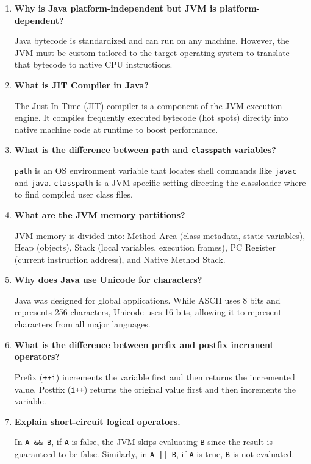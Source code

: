 \documentclass[12pt,a4paper]{article}
\newcommand{\Q}[1]{\textbf{#1}\par\noindent\ignorespaces}
\begin{document}
\begin{tcolorbox}[exambox, title={\textbf{Frequently Asked / Viva Questions}}]
\begin{enumerate}[leftmargin=*, label=\textbf{Q\arabic*.}, itemsep=5pt]
  \item \Q{Why is Java platform-independent but JVM is platform-dependent?}
        Java bytecode is standardized and can run on any machine. However, the JVM must be custom-tailored to the target operating system to translate that bytecode to native CPU instructions.
        
  \item \Q{What is JIT Compiler in Java?}
        The Just-In-Time (JIT) compiler is a component of the JVM execution engine. It compiles frequently executed bytecode (hot spots) directly into native machine code at runtime to boost performance.
        
  \item \Q{What is the difference between \texttt{path} and \texttt{classpath} variables?}
        \texttt{path} is an OS environment variable that locates shell commands like \texttt{javac} and \texttt{java}. \texttt{classpath} is a JVM-specific setting directing the classloader where to find compiled user class files.
        
  \item \Q{What are the JVM memory partitions?}
        JVM memory is divided into: Method Area (class metadata, static variables), Heap (objects), Stack (local variables, execution frames), PC Register (current instruction address), and Native Method Stack.
        
  \item \Q{Why does Java use Unicode for characters?}
        Java was designed for global applications. While ASCII uses 8 bits and represents 256 characters, Unicode uses 16 bits, allowing it to represent characters from all major languages.
        
  \item \Q{What is the difference between prefix and postfix increment operators?}
        Prefix (\texttt{++i}) increments the variable first and then returns the incremented value. Postfix (\texttt{i++}) returns the original value first and then increments the variable.
        
  \item \Q{Explain short-circuit logical operators.}
        In \texttt{A \&\& B}, if \texttt{A} is false, the JVM skips evaluating \texttt{B} since the result is guaranteed to be false. Similarly, in \texttt{A || B}, if \texttt{A} is true, \texttt{B} is not evaluated.
        

\end{enumerate}
\end{tcolorbox}
\end{document}
